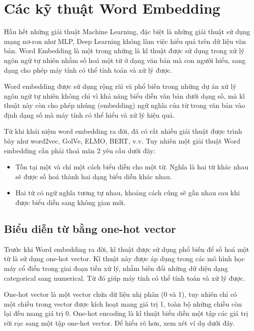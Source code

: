 \section{Các kỹ thuật Word Embedding}
\label{sec:word-embedding-in-details}
Hầu hết những giải thuật Machine Learning, đặc biệt là những giải thuật sử dụng mạng nơ-ron như MLP, Deep Learning không làm việc hiểu quả trên dữ liệu văn bản. Word Embedding là một trong những là kĩ thuật được sử dụng trong xử lý ngôn ngữ tự nhiên nhằm số hoá một từ ở dạng văn bản mà con người hiểu, sang dạng cho phép máy tính có thể tính toán và xử lý được.

Word embedding được sử dụng rộng rãi và phổ biến trong những dự án xử lý ngôn ngữ tự nhiên không chỉ vì khả năng biểu diễn văn bản dưới dạng số, mà kĩ thuật này còn cho phép nhúng (embedding) ngữ nghĩa của từ trong văn bản vào định dạng số mà máy tính có thể hiểu và xử lý hiệu quả.

Từ khi khái niệm word embedding ra đời, đã có rất nhiều giải thuật được trình bày như word2vec, GolVe, ELMO, BERT, v.v. Tuy nhiên một giải thuật Word embedding cần phải thoả mãn 2 yêu cầu dưới đây:

\begin{itemize}
    \item Tồn tại một và chỉ một cách biểu diễn cho một từ. Nghĩa là hai từ khác nhau sẽ được số hoá thành hai dạng biểu diễn khác nhau.

    \item Hai từ có ngữ nghĩa tương tự nhau, khoảng cách cũng sẽ gần nhau sau khi được biểu diễn sang không gian mới.
\end{itemize}


\subsection{Biểu diễn từ bằng one-hot vector}
\label{one-hot-vector-in-details}

Trước khi Word embedding ra đời, kĩ thuật được sử dụng phổ biến để số hoá một từ là sử dụng one-hot vector. Kĩ thuật này được áp dụng trong các mô hình học máy cổ điển trong giai đoạn tiền xử lý, nhằm biến đổi những dữ diệu dạng categorical sang numerical. Từ đó giúp máy tính có thể tính toán và xử lý được.

One-hot vector là một vector chứa dữ liệu nhị phân (0 và 1), tuy nhiên chỉ có một chiều trong vector được kích hoạt mang giá trị 1, toàn bộ những chiều còn lại đều mang giá trị 0. One-hot encoding là kĩ thuật biểu diễn một tập các giá trị rời rạc sang một tập one-hot vector. Để hiểu rõ hơn, xem xét ví dụ dưới đây.

